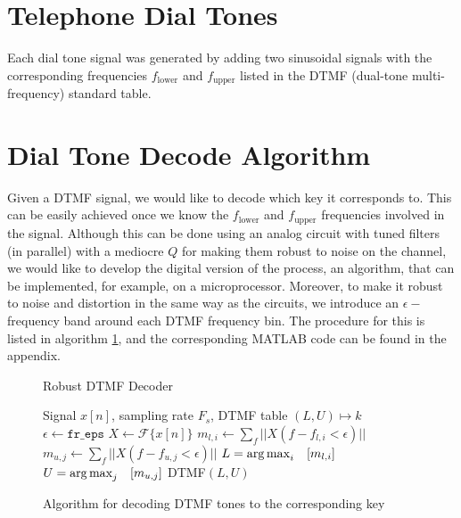 \documentclass[10pt]{article}
\begin{document}
\section{Telephone Dial Tones}
Each dial tone signal was generated by adding two sinusoidal signals with the corresponding frequencies $f_\text{lower}$ and $f_\text{upper}$ listed in the DTMF (dual-tone multi-frequency) standard table.

\section{Dial Tone Decode Algorithm}
Given a DTMF signal, we would like to decode which key it corresponds to. This can be easily achieved once we know the $f_\text{lower}$ and $f_\text{upper}$ frequencies involved in the signal. Although this can be done using an analog circuit with tuned filters (in parallel) with a mediocre $Q$ for making them robust to noise on the channel, we would like to develop the digital version of the process, an algorithm, that can be implemented, for example, on a microprocessor. Moreover, to  make it robust to noise and distortion in the same way as the circuits, we introduce an $\epsilon -$frequency band around each DTMF frequency bin. The procedure for this is listed in algorithm \ref{alg:dtmf_decode_algorithm}, and the corresponding \textsc{MATLAB} code can be found in the appendix.

\begin{figure}[ht]
  \centering
  \begin{minipage}{.64\linewidth}
        \begin{algorithm}[H]
            \caption{Robust DTMF Decoder}
            \label{alg:dtmf_decode_algorithm}
            \begin{algorithmic}
                \Require Signal $x[n]$, sampling rate $F_s$, DTMF table $(L, U) \mapsto k$
                \State $\epsilon \gets \texttt{fr\_eps}$
                \State $X \gets \mathcal{F}\{x[n]\}$ 
                    \State $m_{l, i} \gets \sum_f||X(f-f_{l,i} < \epsilon)||$
                    \State $m_{u, j} \gets \sum_f||X(f-f_{u,j} < \epsilon)||$
                \EndFor
                \State $L = \operatorname*{arg\,max}_i \quad [m_{l, i}]$  
                \State $U = \operatorname*{arg\,max}_j \quad [m_{u, j}]$
                \State \Return DTMF$(L, U)$ 
            \end{algorithmic}
        \end{algorithm}
    \end{minipage}
    \caption{Algorithm for decoding DTMF tones to the corresponding key}
\end{figure}
\end{document}
